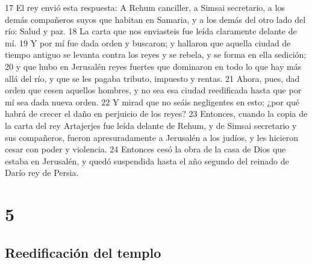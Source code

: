 17 El rey envió esta respuesta: A Rehum canciller, a Simsai secretario, a los demás compañeros suyos que habitan en Samaria, y a los demás del otro lado del río: Salud y paz.
18 La carta que nos enviasteis fue leída claramente delante de mí.
19 Y por mí fue dada orden y buscaron; y hallaron que aquella ciudad de tiempo antiguo se levanta contra los reyes y se rebela, y se forma en ella sedición;
20 y que hubo en Jerusalén reyes fuertes que dominaron en todo lo que hay más allá del río, y que se les pagaba tributo, impuesto y rentas.
21 Ahora, pues, dad orden que cesen aquellos hombres, y no sea esa ciudad reedificada hasta que por mí sea dada nueva orden.
22 Y mirad que no seáis negligentes en esto; ¿por qué habrá de crecer el daño en perjuicio de los reyes?
23 Entonces, cuando la copia de la carta del rey Artajerjes fue leída delante de Rehum, y de Simsai secretario y sus compañeros, fueron apresuradamente a Jerusalén a los judíos, y les hicieron cesar con poder y violencia.
24 Entonces cesó la obra de la casa de Dios que estaba en Jerusalén, y quedó suspendida hasta el año segundo del reinado de Darío rey de Persia.

\chapter{5}

\section*{Reedificación del templo}


